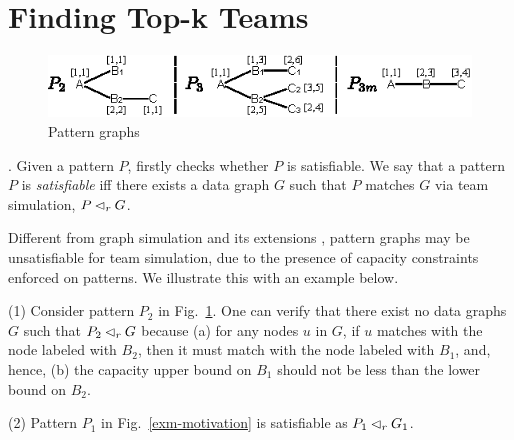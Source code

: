 \section{Finding Top-k Teams}
\label{sec-tsimAlg}


\begin{figure}[tb!]
	\begin{center}
		\includegraphics[scale=1.28]{./fig/consistency_motivation.eps}
	\end{center}
	\vspace{-3ex}
	\caption{Pattern graphs}
	\vspace{-4ex}
	\label{fig-consistency-example}
\end{figure}




.
Given a pattern $P$, \grouprec firstly checks whether $P$ is satisfiable. We say that a pattern $P$ is {\em satisfiable} iff there exists a data graph $G$ such that $P$ matches $G$ via team simulation, \ie $P \lhd_r G$.

Different from graph simulation \cite{infsimu95} and its extensions \cite{FanLMTWW10,MaCFHW14},
pattern graphs may be unsatisfiable for team simulation, due to the presence of capacity constraints enforced on patterns. We illustrate this with an example below.

\begin{example}
\label{exm-consistency}
\ni(1)  Consider pattern $P_2$ in Fig.~\ref{fig-consistency-example}.
One can verify that there exist no data graphs $G$ such that $P_2 \lhd_r G$ because (a) for any nodes $u$ in $G$, if $u$ matches with the node labeled with $B_2$, then it must match with the node labeled with $B_1$, and, hence, (b) the capacity upper bound on $B_1$ should not be less than the lower bound on $B_2$.

\sstab(2) Pattern $P_1$ in Fig.~\ref{exm-motivation} is satisfiable as $P_1 \lhd_r G_1$.
\end{example}



